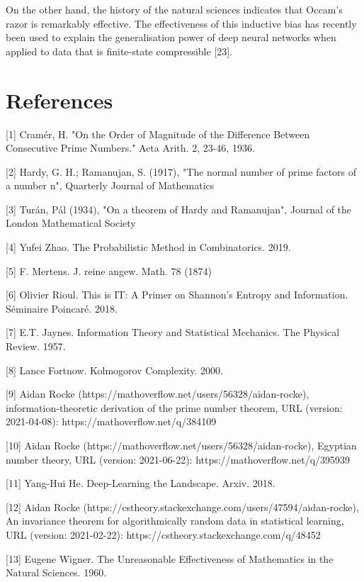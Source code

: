 \documentclass{article}
\begin{document}
On the other hand, the history of the natural sciences indicates that Occam's razor is remarkably effective. The effectiveness
of this inductive bias has recently been used to explain the generalisation power of deep neural networks when applied to data that is finite-state compressible [23].

\newpage

\section*{References}

\small

[1] Cramér, H. "On the Order of Magnitude of the Difference Between Consecutive Prime Numbers." Acta Arith. 2, 23-46, 1936.

[2] Hardy, G. H.; Ramanujan, S. (1917), "The normal number of prime factors of a number n", Quarterly Journal of Mathematics

[3] Turán, Pál (1934), "On a theorem of Hardy and Ramanujan", Journal of the London Mathematical Society

[4] Yufei Zhao. The Probabilistic Method in Combinatorics. 2019.

[5] F. Mertens. J. reine angew. Math. 78 (1874)

[6] Olivier Rioul. This is IT: A Primer on Shannon’s Entropy and Information. Séminaire Poincaré. 2018.

[7] E.T. Jaynes. Information Theory and Statistical Mechanics. The Physical Review. 1957.

[8] Lance Fortnow. Kolmogorov Complexity. 2000.

[9] Aidan Rocke (https://mathoverflow.net/users/56328/aidan-rocke), information-theoretic derivation of the prime number theorem, URL (version: 2021-04-08): https://mathoverflow.net/q/384109

[10] Aidan Rocke (https://mathoverflow.net/users/56328/aidan-rocke), Egyptian number theory, URL (version: 2021-06-22): https://mathoverflow.net/q/395939

[11] Yang-Hui He. Deep-Learning the Landscape. Arxiv. 2018. 

[12] Aidan Rocke (https://cstheory.stackexchange.com/users/47594/aidan-rocke), An invariance theorem for algorithmically random data in statistical learning, URL (version: 2021-02-22): https://cstheory.stackexchange.com/q/48452

[13] Eugene Wigner. The Unreasonable Effectiveness of Mathematics in the Natural Sciences. 1960.
\end{document}
